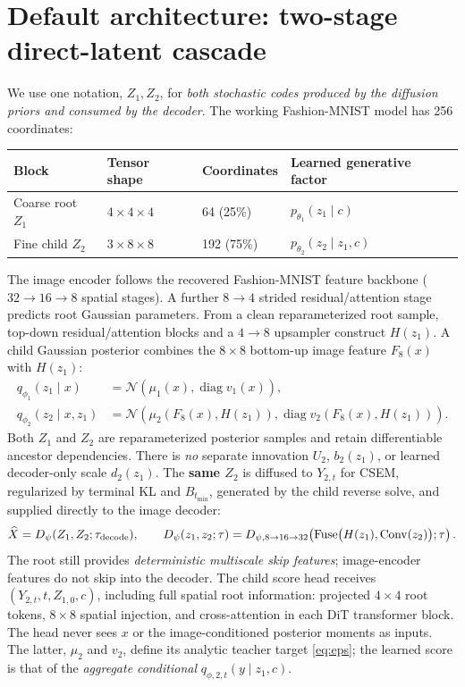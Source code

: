 \documentclass[10pt]{article}
\newcommand{\N}{\mathcal N}
\begin{document}
\section{Default architecture: two-stage direct-latent cascade}\label{sec:directarch}
We use one notation, $Z_1,Z_2$, for \emph{both stochastic codes produced by the diffusion priors and consumed by the decoder}. The working Fashion-MNIST model has 256 coordinates:
\begin{center}
\begin{tabular}{@{}llll@{}}
\toprule
Block & Tensor shape & Coordinates & Learned generative factor\\
\midrule
Coarse root $Z_1$ & $4\times4\times4$ & 64 (25\%) & $p_{\theta_1}(z_1\mid c)$\\
Fine child $Z_2$ & $3\times8\times8$ & 192 (75\%) & $p_{\theta_2}(z_2\mid z_1,c)$\\
\bottomrule
\end{tabular}
\end{center}
The image encoder follows the recovered Fashion-MNIST feature backbone ($32\to16\to8$ spatial stages). A further $8\to4$ strided residual/attention stage predicts root Gaussian parameters. From a clean reparameterized root sample, top-down residual/attention blocks and a $4\to8$ upsampler construct $H(z_1)$. A child Gaussian posterior combines the $8\times8$ bottom-up image feature $F_8(x)$ with $H(z_1)$:
\begin{align}
q_{\phi_1}(z_1\mid x)&=\N\!\left(\mu_1(x),\operatorname{diag}v_1(x)\right),\\
q_{\phi_2}(z_2\mid x,z_1)&=\N\!\left(\mu_2(F_8(x),H(z_1)),\operatorname{diag}v_2(F_8(x),H(z_1))\right).
\label{eq:directpost}
\end{align}
Both $Z_1$ and $Z_2$ are reparameterized posterior samples and retain differentiable ancestor dependencies. There is \emph{no} separate innovation $U_2$, $b_2(z_1)$, or learned decoder-only scale $d_2(z_1)$. The \textbf{same $Z_2$} is diffused to $Y_{2,t}$ for CSEM, regularized by terminal KL and $B_{t_{\min}}$, generated by the child reverse solve, and supplied directly to the image decoder:
\begin{equation}
\widehat X=D_\psi(Z_1,Z_2;\tau_{\rm decode}),\qquad
D_\psi(z_1,z_2;\tau)=D_{\psi,8\to16\to32}\!\left(\mathrm{Fuse}\bigl(H(z_1),\mathrm{Conv}(z_2)\bigr);\tau\right).
\label{eq:directdecode}
\end{equation}
The root still provides \emph{deterministic multiscale skip features}; image-encoder features do not skip into the decoder. The child score head receives $(Y_{2,t},t,Z_{1,0},c)$, including full spatial root information: projected $4\times4$ root tokens, $8\times8$ spatial injection, and cross-attention in each DiT transformer block. The head never sees $x$ or the image-conditioned posterior moments as inputs. The latter, $\mu_2$ and $v_2$, define its analytic teacher target \eqref{eq:eps}; the learned score is that of the \emph{aggregate conditional} $q_{\phi,2,t}(y\mid z_1,c)$.
\end{document}
